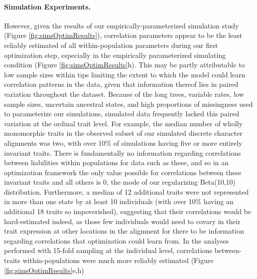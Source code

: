 \paragraph{Simulation Experiments.} However, given the results of our empirically-parameterized simulation study (Figure \ref{fig:simsOptimResults}), correlation parameters appear to be the least reliably estimated of all within-population parameters during our first optimization step, especially in the empirically parameterized simulating condition (Figure \ref{fig:simsOptimResults}h). This may be partly attributable to low sample sizes within tips limiting the extent to which the model could learn correlation patterns in the data, given that information thereof lies in paired variation throughout the dataset. Because of the long trees, variable rates, low sample sizes, uncertain ancestral states, and high proportions of missingness used to parameterize our simulations, simulated data frequently lacked this paired variation at the ordinal trait level. For example, the median number of wholly monomorphic traits in the observed subset of our simulated discrete character alignments was two, with over 10\% of simulations having five or more entirely invariant traits. There is fundamentally no information regarding correlations between liabilities within populations for data such as these, and so in an optimization framework the only value possible for correlations between these invariant traits and all others is 0, the mode of our regularizing Beta(10,10) distribution. Furthermore, a median of 12 additional traits were not represented in more than one state by at least 10 individuals (with over 10\% having an additional 18 traits so impoverished), suggesting that their correlations would be hard-estimated indeed, as those few individuals would need to covary in their trait expression at other locations in the alignment for there to be information regarding correlations that optimization could learn from.  In the analyses performed with 15-fold sampling at the individual level, correlations between-traits within-populations were much more reliably estimated (Figure \ref{fig:simsOptimResults}e,h)


